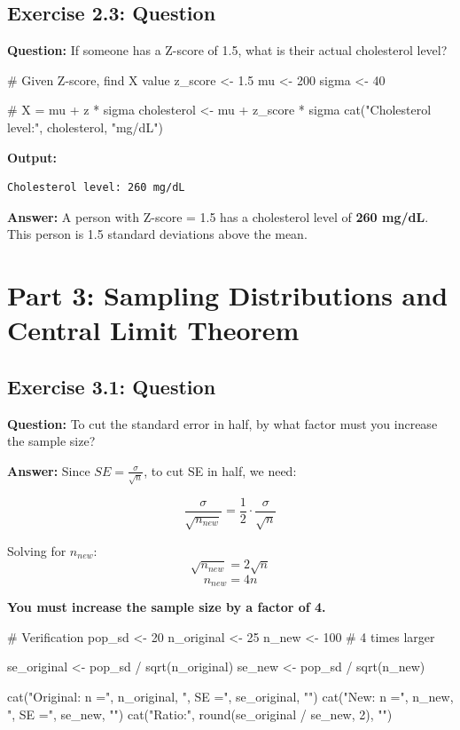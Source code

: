 \documentclass[11pt]{article}
\begin{document}
\subsection{Exercise 2.3: Question}

\textbf{Question:} If someone has a Z-score of 1.5, what is their actual cholesterol level?

\begin{rcode}
# Given Z-score, find X value
z_score <- 1.5
mu <- 200
sigma <- 40

# X = mu + z * sigma
cholesterol <- mu + z_score * sigma
cat("Cholesterol level:", cholesterol, "mg/dL\n")
\end{rcode}

\begin{routput}
\textbf{Output:}
\begin{verbatim}
Cholesterol level: 260 mg/dL
\end{verbatim}
\end{routput}

\textcolor{correctgreen}{\textbf{Answer:}} A person with Z-score = 1.5 has a cholesterol level of \textbf{260 mg/dL}. This person is 1.5 standard deviations above the mean.

\section{Part 3: Sampling Distributions and Central Limit Theorem}

\subsection{Exercise 3.1: Question}

\textbf{Question:} To cut the standard error in half, by what factor must you increase the sample size?

\textcolor{correctgreen}{\textbf{Answer:}} Since $SE = \frac{\sigma}{\sqrt{n}}$, to cut SE in half, we need:

$$\frac{\sigma}{\sqrt{n_{new}}} = \frac{1}{2} \cdot \frac{\sigma}{\sqrt{n}}$$

Solving for $n_{new}$:
$$\sqrt{n_{new}} = 2\sqrt{n}$$
$$n_{new} = 4n$$

\textbf{You must increase the sample size by a factor of 4.}

\begin{rcode}
# Verification
pop_sd <- 20
n_original <- 25
n_new <- 100  # 4 times larger

se_original <- pop_sd / sqrt(n_original)
se_new <- pop_sd / sqrt(n_new)

cat("Original: n =", n_original, ", SE =", se_original, "\n")
cat("New: n =", n_new, ", SE =", se_new, "\n")
cat("Ratio:", round(se_original / se_new, 2), "\n")
\end{rcode}
\end{document}
